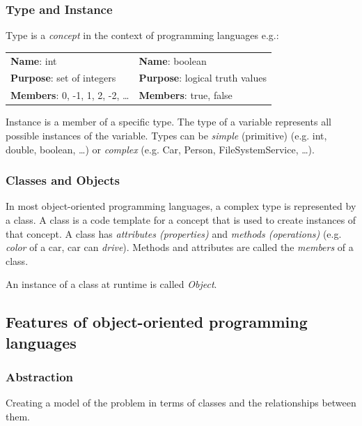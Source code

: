 \subsubsection*{Type and Instance}
Type is a \textit{concept} in the context of programming languages e.g.:
\begin{center}
	\begin{tabular}{ll}
		\textbf{Name}: int & \textbf{Name}: boolean \\
		\textbf{Purpose}: set of integers & \textbf{Purpose}: logical truth values \\
		\textbf{Members}: 0, -1, 1, 2, -2, \dots & \textbf{Members}: true, false \\
	\end{tabular}
\end{center}

Instance is a member of a specific type.
The type of a variable represents all possible instances of the variable.
Types can be \textit{simple} (primitive) (e.g. int, double, boolean, \dots) or \textit{complex} (e.g. Car, Person, FileSystemService, \dots).

\subsubsection*{Classes and Objects}
In most object-oriented programming languages, a complex type is represented by a class.
A class is a code template for a concept that is used to create instances of that concept.
A class has \textit{attributes (properties)} and \textit{methods (operations)} (e.g. \textit{color} of a car, car can \textit{drive}).
Methods and attributes are called the \textit{members} of a class.\newline

An instance of a class at runtime is called \textit{Object}.


\subsection{Features of object-oriented programming languages}
\subsubsection*{Abstraction}
Creating a model of the problem in terms of classes and the relationships between them.



